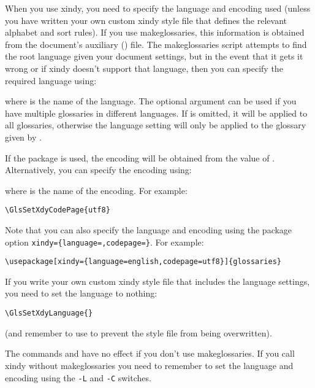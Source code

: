 \documentclass[report,inlinetitle]{nlctdoc}
\begin{document}
When you use \gls{xindy}, you need to specify the language
and encoding used (unless you have written your own custom
\gls*{xindy} style file that defines the relevant alphabet
and sort rules). If you use \gls{makeglossaries},
this information is obtained from the document's auxiliary 
() file.  The \gls{makeglossaries} script attempts to 
find the root language given your document settings, but in the 
event that it gets it wrong or if \gls*{xindy} doesn't support 
that language, then you can specify the required language using:
\begin{definition}[\DescribeMacro{\GlsSetXdyLanguage}]
\end{definition}
where  is the name of the language. The
optional argument can be used if you have multiple glossaries
in different languages. If  is omitted, it
will be applied to all glossaries, otherwise the language
setting will only be applied to the glossary given by
.

If the  package is used, the encoding will be
obtained from the value of . 
Alternatively, you can specify the encoding using:
\begin{definition}[\DescribeMacro{\GlsSetXdyCodePage}]
\end{definition}
where  is the name of the encoding. For example:
\begin{verbatim}
\GlsSetXdyCodePage{utf8}
\end{verbatim}

Note that you can also specify the language and encoding using
the package option 
\verb|xindy={language=|\verb|,codepage=|\verb|}|.
For example:
\begin{verbatim}
\usepackage[xindy={language=english,codepage=utf8}]{glossaries}
\end{verbatim}

If you write your own custom \gls{xindy} style file that 
includes the language settings, you need to set the language
to nothing:
\begin{verbatim}
\GlsSetXdyLanguage{}
\end{verbatim}
(and remember to use  to prevent the style file from
being overwritten).

\begin{important}
The commands  and 
have no effect if you don't use \gls{makeglossaries}. If
you call \gls{xindy} without \gls*{makeglossaries} you
need to remember to set the language and encoding using the
\texttt{-L} and \texttt{-C} switches.
\end{important}
\end{document}
